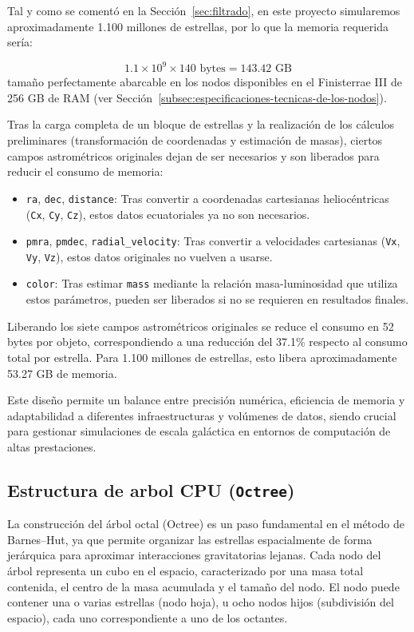 Tal y como se comentó en la Sección~\ref{sec:filtrado}, en este proyecto simularemos aproximadamente 1.100 millones de estrellas, por lo que la memoria requerida sería:

\[
    1.1 \times 10^9 \times 140 \text{ bytes} = 143.42 \text{ GB}
\]
tamaño perfectamente abarcable en los nodos disponibles en el Finisterrae III de 256 GB de RAM (ver Sección~\ref{subsec:especificaciones-tecnicas-de-los-nodos}).

Tras la carga completa de un bloque de estrellas y la realización de los cálculos preliminares (transformación de coordenadas y estimación de masas), ciertos campos astrométricos originales dejan de ser necesarios y son liberados para reducir el consumo de memoria:

\begin{itemize}
    \item \texttt{ra}, \texttt{dec}, \texttt{distance}: Tras convertir a coordenadas cartesianas heliocéntricas (\texttt{Cx}, \texttt{Cy}, \texttt{Cz}), estos datos ecuatoriales ya no son necesarios.

    \item \texttt{pmra}, \texttt{pmdec}, \texttt{radial\_velocity}: Tras convertir a velocidades cartesianas (\texttt{Vx}, \texttt{Vy}, \texttt{Vz}), estos datos originales no vuelven a usarse.

    \item \texttt{color}: Tras estimar \texttt{mass} mediante la relación masa-luminosidad que utiliza estos parámetros, pueden ser liberados si no se requieren en resultados finales.
\end{itemize}
Liberando los siete campos astrométricos originales se reduce el consumo en 52 bytes por objeto, correspondiendo a una reducción del 37.1\% respecto al consumo total por estrella.
Para 1.100 millones de estrellas, esto libera aproximadamente 53.27 GB de memoria.

Este diseño permite un balance entre precisión numérica, eficiencia de memoria y adaptabilidad a diferentes infraestructuras y volúmenes de datos, siendo crucial para gestionar simulaciones de escala galáctica en entornos de computación de altas prestaciones.

\subsection{Estructura de arbol CPU (\texttt{Octree})}\label{subsec:estructura-de-arbol-cpu(texttt{octree})}
La construcción del árbol octal (Octree) es un paso fundamental en el método de Barnes–Hut, ya que permite organizar las estrellas espacialmente de forma jerárquica para aproximar interacciones gravitatorias lejanas.
Cada nodo del árbol representa un cubo en el espacio, caracterizado por una masa total contenida, el centro de la masa acumulada y el tamaño del nodo.
El nodo puede contener una o varias estrellas (nodo hoja), u ocho nodos hijos (subdivisión del espacio), cada uno correspondiente a uno de los octantes.

